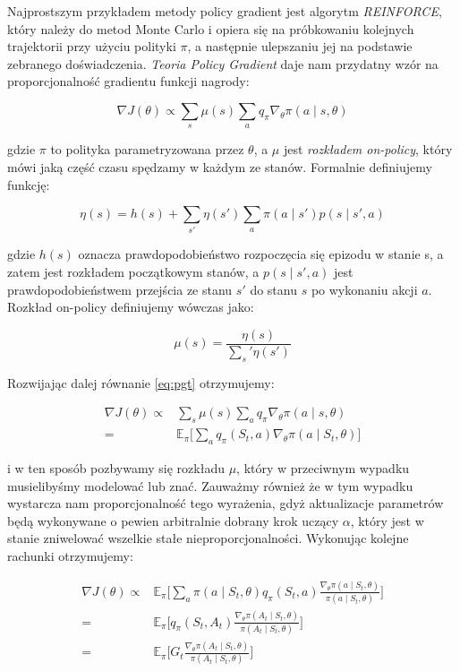 \documentclass[licencjacka]{pracamgr}
\begin{document}
Najprostszym przykładem metody policy gradient jest algorytm \emph{REINFORCE}, który należy do metod Monte Carlo i opiera się na próbkowaniu kolejnych trajektorii przy użyciu polityki $\pi$, a następnie ulepszaniu jej na podstawie zebranego doświadczenia. \emph{Teoria Policy Gradient} daje nam przydatny wzór na proporcjonalność gradientu funkcji nagrody:

\begin{equation}\label{eq:pgt}
\nabla J(\theta) \propto \sum_s \mu(s) \sum_a q_{\pi} \nabla_{\theta} \pi(a \mid s, \theta)
\end{equation}

gdzie $\pi$ to polityka parametryzowana przez $\theta$, a $\mu$ jest \emph{rozkładem on-policy}, który mówi jaką część czasu spędzamy w każdym ze stanów. Formalnie definiujemy funkcję:

$$ \eta(s) = h(s) + \sum_{s'} \eta(s') \sum_{a} \pi(a \mid s') p(s \mid s', a) $$

gdzie $ h(s) $ oznacza prawdopodobieństwo rozpoczęcia się epizodu w stanie s, a zatem jest rozkładem początkowym stanów, a $p(s \mid s', a) $ jest prawdopodobieństwem przejścia ze stanu $s'$ do stanu $s$ po wykonaniu akcji $a$. Rozkład on-policy definiujemy wówczas jako:

$$ \mu (s) = \frac{\eta(s)}{\sum_s' \eta(s')} $$

Rozwijając dalej równanie \eqref{eq:pgt} otrzymujemy:

\begin{align*}
\nabla J(\theta) \propto & \sum_s \mu(s) \sum_a q_{\pi} \nabla_{\theta} \pi(a \mid s, \theta) \\
= & \mathbb{E}_\pi \Bigg[ \sum_{a} q_\pi (S_t, a) \nabla_\theta \pi(a \mid S_t, \theta) \Bigg]
\end{align*}

i w ten sposób pozbywamy się rozkładu $\mu$, który w przeciwnym wypadku musielibyśmy modelować lub znać. Zauważmy również że w tym wypadku wystarcza nam proporcjonalność tego wyrażenia, gdyż aktualizacje parametrów będą wykonywane o pewien arbitralnie dobrany krok uczący $\alpha$, który jest w stanie zniwelować wszelkie stałe nieproporcjonalności. Wykonując kolejne rachunki otrzymujemy: 

\begin{align*}
\nabla J(\theta) \propto  & \mathbb{E}_\pi \Bigg[ \sum_{a} \pi(a \mid S_t, \theta) q_\pi (S_t, a) \frac{\nabla_\theta \pi(a \mid S_t, \theta)}{\pi(a \mid S_t, \theta)} \Bigg] \\
= & \mathbb{E}_\pi \Bigg[ q_\pi(S_t, A_t) \frac{\nabla_\theta \pi(A_t \mid S_t, \theta)}{\pi(A_t \mid S_t, \theta)} \Bigg] \\ 
= & \mathbb{E}_\pi \Bigg[ G_t \frac{\nabla_\theta \pi(A_t \mid S_t, \theta)}{\pi(A_t \mid S_t, \theta)} \Bigg] 
\end{align*}
\end{document}
